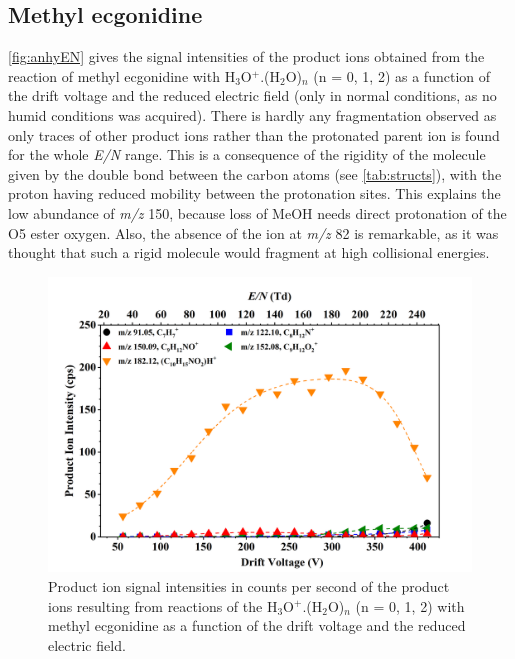 \subsection{Methyl ecgonidine}



\autoref{fig:anhyEN} gives the signal intensities of the product ions obtained from the reaction of methyl ecgonidine with H$_3$O$^+$.(H$_2$O)$_n$ (n = 0, 1, 2) as a function of the drift voltage and the reduced electric field (only in normal conditions, as no humid conditions was acquired).
%
There is hardly any fragmentation observed as only traces of other product ions rather than the protonated parent ion is found for the whole \textit{E/N} range.
%
This is a consequence of the rigidity of the molecule given by the double bond between the carbon atoms (see \autoref{tab:structs}), with the proton having reduced mobility between the protonation sites.
%
This explains the low abundance of \textit{m/z} 150, because loss of MeOH needs direct protonation of the O5 ester oxygen.
%
Also, the absence of the ion at \textit{m/z} 82 is remarkable, as it was thought that such a rigid molecule would fragment at high collisional energies.





\begin{figure}[htbp]
\centering
\includegraphics[width=0.8\linewidth]{pics/cocaine-chapter/ame-cps.png}
\caption{Product ion signal intensities in counts per second of the product ions resulting from reactions of the H$_3$O$^+$.(H$_2$O)$_n$ (n = 0, 1, 2) with methyl ecgonidine as a function of the drift voltage and the reduced electric field.} 
\label{fig:anhyEN}
\end{figure}



